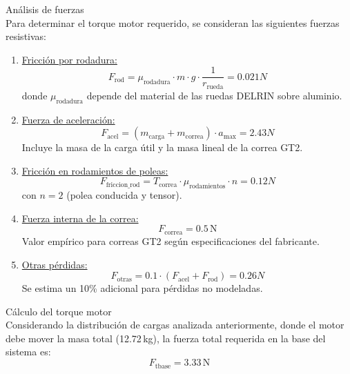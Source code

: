 Análisis de fuerzas\\
Para determinar el torque motor requerido, se consideran las siguientes fuerzas resistivas:

\begin{enumerate}
    \item \underline{Fricción por rodadura:}
    \begin{equation}
    F_{\text{rod}} = \mu_{\text{rodadura}} \cdot m \cdot g \cdot \frac{1}{r_{\text{rueda}}}= 0.021N
    \end{equation}
    donde $\mu_{\text{rodadura}}$ depende del material de las ruedas DELRIN sobre aluminio.
    
    \item \underline{Fuerza de aceleración:}
    \begin{equation}
    F_{\text{acel}} = (m_{\text{carga}} + m_{\text{correa}}) \cdot a_{\text{max}} = 2.43 N
    \end{equation}
    Incluye la masa de la carga útil y la masa lineal de la correa GT2.
    
    \item \underline{Fricción en rodamientos de poleas:}
    \begin{equation}
    F_{\text{friccion\_rod}} = T_{\text{correa}} \cdot \mu_{\text{rodamientos}} \cdot n = 0.12N
    \end{equation}
    con $n = 2$ (polea conducida y tensor).
    
    \item \underline{Fuerza interna de la correa:}
    \begin{equation}
    F_{\text{correa}} = 0.5\,\text{N}
    \end{equation}
    Valor empírico para correas GT2 según especificaciones del fabricante.
    
    \item \underline{Otras pérdidas:}
    \begin{equation}
    F_{\text{otras}} = 0.1 \cdot (F_{\text{acel}} + F_{\text{rod}})=0.26N
    \end{equation}
    Se estima un 10\% adicional para pérdidas no modeladas.
\end{enumerate}

Cálculo del torque motor\\
Considerando la distribución de cargas analizada anteriormente, donde el motor debe mover la masa total (12.72\,kg), la fuerza total requerida en la base del sistema es:
\begin{equation}
F_{\text{tbase}} = 3.33\,\text{N}
\end{equation}


